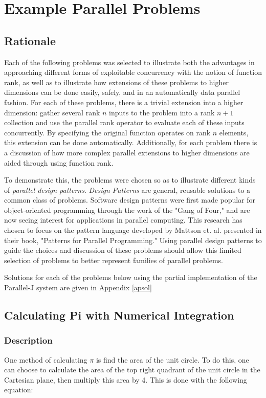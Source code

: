\chapter{Example Parallel Problems}
\label{probs}

\section{Rationale}
Each of the following problems was selected to illustrate 
both the advantages in approaching different forms of exploitable concurrency with the notion of function rank, 
as well as to illustrate how extensions of these problems to higher dimensions can be done easily, safely, 
and in an automatically data parallel fashion.
For each of these problems, there is a trivial extension into a higher dimension: 
gather several rank $n$ inputs to the problem into a rank $n+1$ collection 
and use the parallel rank operator to evaluate each of these inputs concurrently.
By specifying the original function operates on rank $n$ elements, 
this extension can be done automatically.
Additionally, for each problem there is a discussion 
of how more complex parallel extensions to higher dimensions are aided through using function rank. 

To demonstrate this, the problems were chosen so as to illustrate different kinds of \textit{parallel design patterns}. 
\textit{Design Patterns} are general, reusable solutions to a common class of problems. %
Software design patterns were first made popular for object-oriented programming through the work of the "Gang of Four," %
and are now seeing interest for applications in parallel computing. \cite{mass} 
This research has chosen to focus on the pattern language developed by Mattson et. al. \cite{mass}
presented in their book, "Patterns for Parallel Programming." %
Using parallel design patterns to guide the choices and discussion of these problems 
should allow this limited selection of problems to better represent families of parallel problems.

Solutions for each of the problems below using the partial implementation of the Parallel-J system
are given in Appendix \ref{apsol}

\section{Calculating Pi with Numerical Integration}
\subsection{Description}
One method of calculating $\pi$ is find the area of the unit circle. 
To do this, one can choose to calculate the area of the top right quadrant of the unit circle in the Cartesian plane, 
then multiply this area by 4. 
This is done with the following equation:

